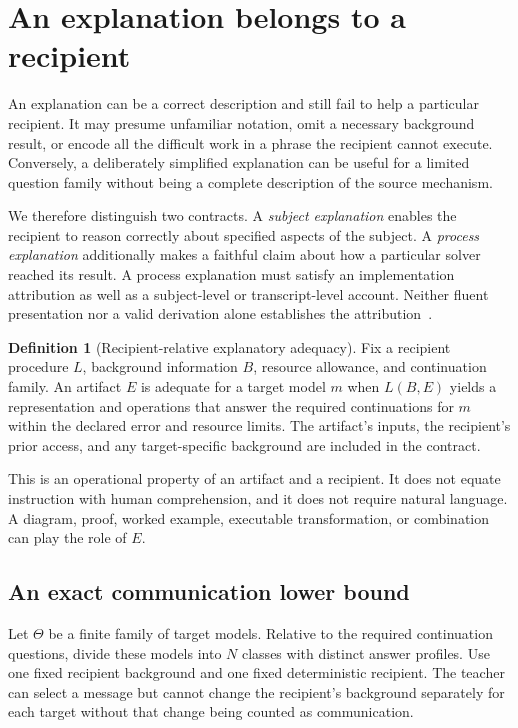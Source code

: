 \documentclass[11pt,letterpaper]{article}
\theoremstyle{plain}
\theoremstyle{definition}
\newtheorem{definition}[theorem]{Definition}
\begin{document}
\section{An explanation belongs to a recipient}\label{sec:explanation}
An explanation can be a correct description and still fail to help a particular recipient. It may presume unfamiliar notation, omit a necessary background result, or encode all the difficult work in a phrase the recipient cannot execute. Conversely, a deliberately simplified explanation can be useful for a limited question family without being a complete description of the source mechanism.

We therefore distinguish two contracts. A \emph{subject explanation} enables the recipient to reason correctly about specified aspects of the subject. A \emph{process explanation} additionally makes a faithful claim about how a particular solver reached its result. A process explanation must satisfy an implementation attribution as well as a subject-level or transcript-level account. Neither fluent presentation nor a valid derivation alone establishes the attribution~\cite{jacovi}.

\begin{definition}[Recipient-relative explanatory adequacy]\label{def:explanation}
Fix a recipient procedure $L$, background information $B$, resource allowance, and continuation family. An artifact $E$ is adequate for a target model $m$ when $L(B,E)$ yields a representation and operations that answer the required continuations for $m$ within the declared error and resource limits. The artifact's inputs, the recipient's prior access, and any target-specific background are included in the contract.
\end{definition}
This is an operational property of an artifact and a recipient. It does not equate instruction with human comprehension, and it does not require natural language. A diagram, proof, worked example, executable transformation, or combination can play the role of $E$.

\subsection{An exact communication lower bound}
Let $\Theta$ be a finite family of target models. Relative to the required continuation questions, divide these models into $N$ classes with distinct answer profiles. Use one fixed recipient background and one fixed deterministic recipient. The teacher can select a message but cannot change the recipient's background separately for each target without that change being counted as communication.
\end{document}
